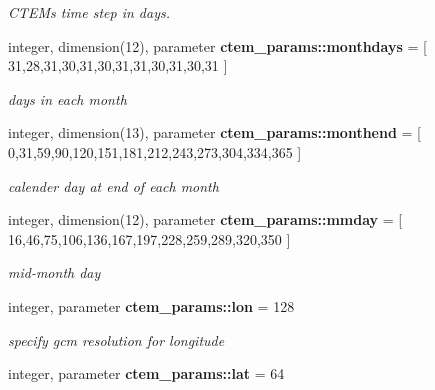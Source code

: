 \begin{DoxyCompactItemize}
\begin{DoxyCompactList}\small\item\em C\+T\+E\+M\textquotesingle{}s time step in days. \end{DoxyCompactList}\item 
\hypertarget{namespacectem__params_a0e6a897e05a05448dd97a7f43db4ca7c}{}integer, dimension(12), parameter {\bfseries ctem\+\_\+params\+::monthdays} = \mbox{[} 31,28,31,30,31,30,31,31,30,31,30,31 \mbox{]}\label{namespacectem__params_a0e6a897e05a05448dd97a7f43db4ca7c}

\begin{DoxyCompactList}\small\item\em days in each month \end{DoxyCompactList}\item 
\hypertarget{namespacectem__params_a5d87ac1657a5c42906ba3b1ce969e38a}{}integer, dimension(13), parameter {\bfseries ctem\+\_\+params\+::monthend} = \mbox{[} 0,31,59,90,120,151,181,212,243,273,304,334,365 \mbox{]}\label{namespacectem__params_a5d87ac1657a5c42906ba3b1ce969e38a}

\begin{DoxyCompactList}\small\item\em calender day at end of each month \end{DoxyCompactList}\item 
\hypertarget{namespacectem__params_a58f69f717e71febe16cd04879bab73c9}{}integer, dimension(12), parameter {\bfseries ctem\+\_\+params\+::mmday} = \mbox{[} 16,46,75,106,136,167,197,228,259,289,320,350 \mbox{]}\label{namespacectem__params_a58f69f717e71febe16cd04879bab73c9}

\begin{DoxyCompactList}\small\item\em mid-\/month day \end{DoxyCompactList}\item 
\hypertarget{namespacectem__params_a082002b794ac9ce9b64bf0753a0a350e}{}integer, parameter {\bfseries ctem\+\_\+params\+::lon} = 128\label{namespacectem__params_a082002b794ac9ce9b64bf0753a0a350e}

\begin{DoxyCompactList}\small\item\em specify gcm resolution for longitude \end{DoxyCompactList}\item 
\hypertarget{namespacectem__params_a008acb1ee9436c954cc4988daa6e0ba0}{}integer, parameter {\bfseries ctem\+\_\+params\+::lat} = 64\label{namespacectem__params_a008acb1ee9436c954cc4988daa6e0ba0}


\end{DoxyCompactItemize}
